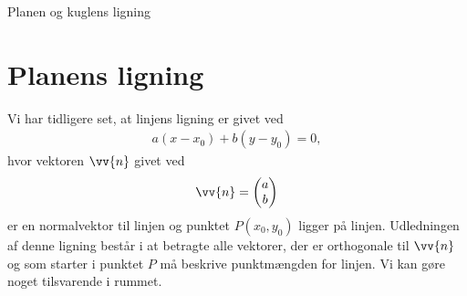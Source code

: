 \begin{center}
\Huge
Planen og kuglens ligning
\end{center}
\section*{Planens ligning}

Vi har tidligere set, at linjens ligning er givet ved
\begin{align*}
	a(x-x_0)+b(y-y_0) = 0,
\end{align*}
hvor vektoren $\vv{n}$ givet ved
\begin{align*}
	\vv{n} =
	\begin{pmatrix}
		a \\ b
	\end{pmatrix}
\end{align*}
er en normalvektor til linjen og punktet $P(x_0,y_0)$ ligger på linjen. Udledningen af denne ligning består i at betragte alle vektorer, der er orthogonale til $\vv{n}$ og som starter i punktet $P$ må beskrive punktmængden for linjen. Vi kan gøre noget tilsvarende i rummet.

